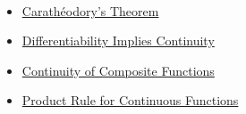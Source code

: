 \begin{remark*}[Dependencies]~\\
\begin{itemize}
  \item \hyperref[thm:caratheodory]{Carathéodory's Theorem}
  \item \hyperref[thm:diff-implies-cont]{Differentiability Implies Continuity}
  \item \hyperref[thm:continuity-composition]{Continuity of Composite Functions}
  \item \hyperref[thm:continuity-product]{Product Rule for Continuous Functions}
\end{itemize}
\end{remark*}